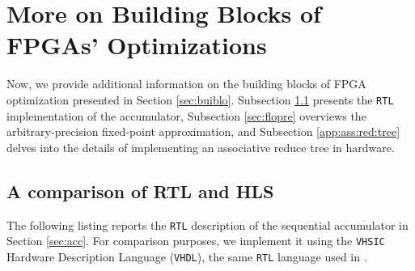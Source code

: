 \documentclass[12pt,american]{article}
\begin{document}
\section{More on Building Blocks of FPGAs' Optimizations}

Now, we provide additional information on the building blocks of FPGA optimization presented in Section \ref{sec:buiblo}. Subsection \ref{app:rtl} presents the \texttt{RTL} implementation of the accumulator, Subsection \ref{sec:flopre} overviews the arbitrary-precision fixed-point approximation, and Subsection \ref{app:ass:red:tree} delves into the details of implementing an associative reduce tree in hardware.

\subsection{A comparison of RTL and HLS}\label{app:rtl}

The following listing reports the \texttt{RTL} description of the sequential accumulator in Section \ref{sec:acc}. For comparison purposes, we implement it using the \texttt{VHSIC} Hardware Description Language (\texttt{VHDL}), the same \texttt{RTL} language used in \citet{Peri2020}.

\newpage
\end{document}
